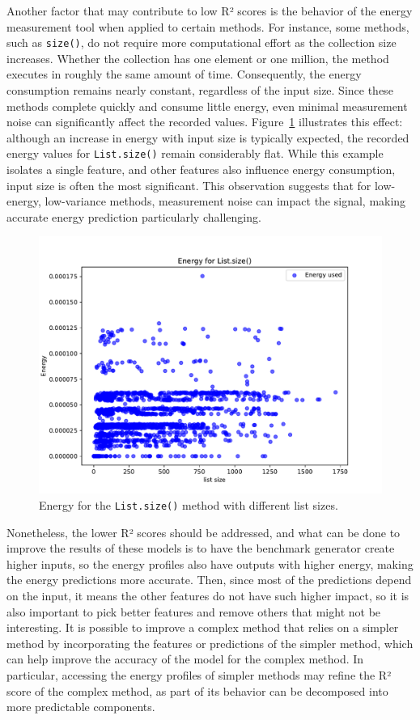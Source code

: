 Another factor that may contribute to low R² scores is the behavior of the energy measurement tool when applied to certain methods. For instance, some methods, such as \texttt{size()}, do not require more computational effort as the collection size increases. Whether the collection has one element or one million, the method executes in roughly the same amount of time. Consequently, the energy consumption remains nearly constant, regardless of the input size. Since these methods complete quickly and consume little energy, even minimal measurement noise can significantly affect the recorded values. Figure~\ref{fig:size_energy} illustrates this effect: although an increase in energy with input size is typically expected, the recorded energy values for \texttt{List.size()} remain considerably flat. While this example isolates a single feature, and other features also influence energy consumption, input size is often the most significant. This observation suggests that for low-energy, low-variance methods, measurement noise can impact the signal, making accurate energy prediction particularly challenging.

\begin{figure}[htbp]
  \centering
  \includegraphics[width = .8 \textwidth]{figures/size_energy.pdf}
  \caption{Energy for the \texttt{List.size()} method with different list sizes.}
  \label{fig:size_energy}
\end{figure}


Nonetheless, the lower R² scores should be addressed, and what can be done to improve the results of these models is to have the benchmark generator create higher inputs, so the energy profiles also have outputs with higher energy, making the energy predictions more accurate. Then, since most of the predictions depend on the input, it means the other features do not have such higher impact, so it is also important to pick better features and remove others that might not be interesting. {\color{blue}It is possible to improve a complex method that relies on a simpler method by incorporating the features or predictions of the simpler method, which can help improve the accuracy of the model for the complex method. In particular, accessing the energy profiles of simpler methods may refine the R² score of the complex method, as part of its behavior can be decomposed into more predictable components.}



